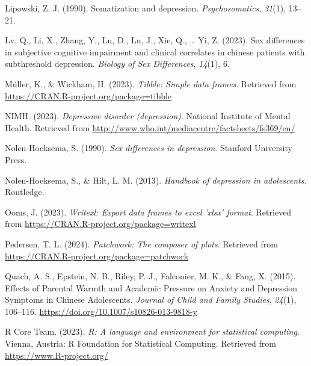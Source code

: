 \documentclass[
  man,floatsintext]{apa6}
\newlength{\cslhangindent}
\newlength{\cslentryspacingunit} %
\newenvironment{CSLReferences}[2] %
 {%
  \setlength{\parindent}{0pt}
  \ifodd #1
  \let\oldpar\par
  \def\par{\hangindent=\cslhangindent\oldpar}
  \fi
  \setlength{\parskip}{#2\cslentryspacingunit}
 }%
 {}
\begin{document}
\begin{CSLReferences}{1}{0}
\leavevmode{}%
Lipowski, Z. J. (1990). Somatization and depression. \emph{Psychosomatics}, \emph{31}(1), 13--21.

\leavevmode{}%
Lv, Q., Li, X., Zhang, Y., Lu, D., Lu, J., Xie, Q., \ldots{} Yi, Z. (2023). Sex differences in subjective cognitive impairment and clinical correlates in chinese patients with subthreshold depression. \emph{Biology of Sex Differences}, \emph{14}(1), 6.

\leavevmode{}%
Müller, K., \& Wickham, H. (2023). \emph{Tibble: Simple data frames}. Retrieved from \url{https://CRAN.R-project.org/package=tibble}

\leavevmode{}%
NIMH. (2023). \emph{Depressive disorder (depression)}. National Institute of Mental Health. Retrieved from \url{http://www.who.int/mediacentre/factsheets/fs369/en/}

\leavevmode{}%
Nolen-Hoeksema, S. (1990). \emph{Sex differences in depression}. Stanford University Press.

\leavevmode{}%
Nolen-Hoeksema, S., \& Hilt, L. M. (2013). \emph{Handbook of depression in adolescents}. Routledge.

\leavevmode{}%
Ooms, J. (2023). \emph{Writexl: Export data frames to excel 'xlsx' format}. Retrieved from \url{https://CRAN.R-project.org/package=writexl}

\leavevmode{}%
Pedersen, T. L. (2024). \emph{Patchwork: The composer of plots}. Retrieved from \url{https://CRAN.R-project.org/package=patchwork}

\leavevmode{}%
Quach, A. S., Epstein, N. B., Riley, P. J., Falconier, M. K., \& Fang, X. (2015). Effects of {Parental} {Warmth} and {Academic} {Pressure} on {Anxiety} and {Depression} {Symptoms} in {Chinese} {Adolescents}. \emph{Journal of Child and Family Studies}, \emph{24}(1), 106--116. \url{https://doi.org/10.1007/s10826-013-9818-y}

\leavevmode{}%
R Core Team. (2023). \emph{R: A language and environment for statistical computing}. Vienna, Austria: R Foundation for Statistical Computing. Retrieved from \url{https://www.R-project.org/}


\end{CSLReferences}
\end{document}
